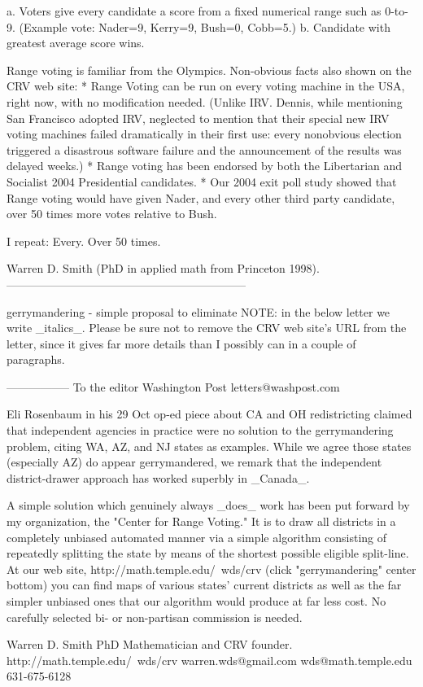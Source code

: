 a. Voters give every candidate a score from a
fixed numerical range such as 0-to-9.
(Example vote: Nader=9, Kerry=9, Bush=0, Cobb=5.)
b. Candidate with greatest average score wins.

Range voting is familiar from the Olympics.
Non-obvious facts also shown on the CRV
web site:
* Range Voting can be run on every voting
machine in the USA, right now, with no modification needed. (Unlike IRV.
Dennis, while mentioning
San Francisco adopted IRV, neglected to mention
that their special new IRV voting machines failed dramatically in their
first use: every nonobvious election triggered a disastrous software failure
and the announcement of the results was delayed weeks.)
* Range voting has been endorsed by both the Libertarian and Socialist 2004
Presidential
candidates.
* Our 2004 exit poll study showed that Range voting would have given Nader,
and every other third party candidate, over 50 times more votes relative to
Bush.

I repeat: Every. Over 50 times.

Warren D. Smith
(PhD in applied math from Princeton 1998).
---------------------------------------------------------------

 gerrymandering - simple proposal to eliminate
NOTE: in the below letter we write _italics_.  Please be sure not to remove
the CRV web site's URL from the letter, since it gives far more details than
I possibly can in a couple of paragraphs.

-----------------
To the editor
Washington Post
letters@washpost.com

Eli Rosenbaum in his 29 Oct op-ed piece about CA and OH redistricting
claimed that independent agencies in practice were no solution to
the gerrymandering problem, citing WA, AZ, and NJ states as examples.
While we agree those states (especially AZ) do appear gerrymandered,
we remark that the independent district-drawer approach has worked superbly 
in _Canada_.

A simple solution which genuinely always _does_ work
has been put forward by my organization, the "Center for Range Voting."
It is to draw all districts in a completely unbiased automated manner via a simple 
algorithm  consisting of repeatedly splitting the state 
by means of the shortest possible eligible split-line.  
At our web site, http://math.temple.edu/~wds/crv (click "gerrymandering" center bottom)
you can find maps of various states' current districts as well as the far simpler
unbiased ones that our algorithm would produce at far less cost.  
No carefully selected bi- or non-partisan commission is needed.

Warren D. Smith
PhD Mathematician and CRV founder.
http://math.temple.edu/~wds/crv
warren.wds@gmail.com
wds@math.temple.edu
631-675-6128
